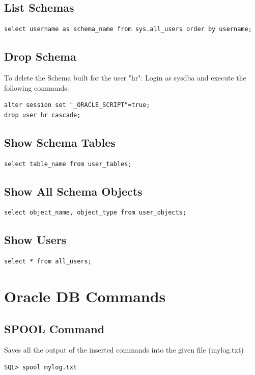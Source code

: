 \documentclass[twoside]{article}
\begin{document}
\subsection{List Schemas}

\begin{verbatim}
select username as schema_name from sys.all_users order by username;
\end{verbatim}

\subsection{Drop Schema}
To delete the Schema built for the user "hr": Login as sysdba and execute the following commands.
\begin{verbatim}
alter session set "_ORACLE_SCRIPT"=true;
drop user hr cascade;
\end{verbatim}

\subsection{Show Schema Tables}
\begin{verbatim}
select table_name from user_tables;
\end{verbatim}

\subsection{Show All Schema Objects}
\begin{verbatim}
select object_name, object_type from user_objects;
\end{verbatim}

\subsection{Show Users}
\begin{verbatim}
select * from all_users;
\end{verbatim}

\section{Oracle DB Commands}

\subsection{SPOOL Command}
Saves all the output of the inserted commands into the given file (mylog.txt)
\begin{verbatim}
SQL> spool mylog.txt
\end{verbatim}
\end{document}

